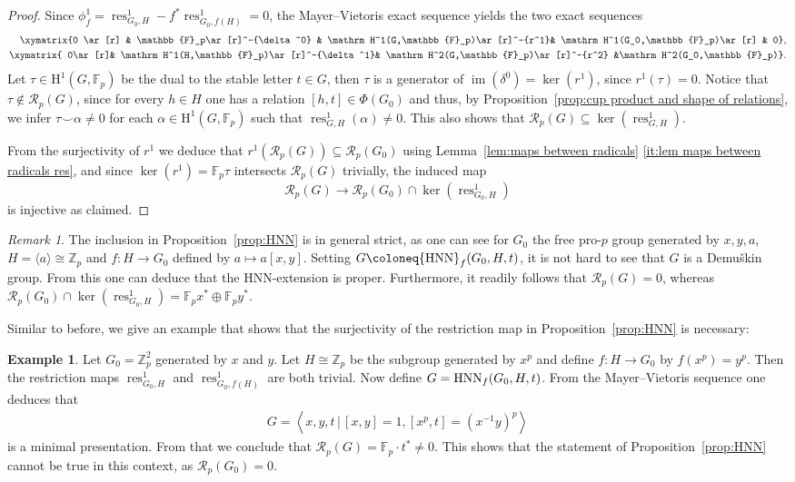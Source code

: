 \documentclass{amsart}
\theoremstyle{definition}
\newtheorem{ex}[thm]{Example}
\theoremstyle{remark}
\newtheorem{rem}[thm]{Remark}
\DeclareMathOperator{\im}{im}
\DeclareMathOperator{\res}{res}
\newcommand{\HNN}{{\rm HNN}}
\newcommand{\ZZ}{\mathbb{Z}}
\newcommand{\FF}{\mathbb{F}}
\newcommand{\calR}{\mathcal{R}}
\newcommand{\rmH}{\mathrm H}%
\newcommand{\pres}[2]{\left\langle{#1}\, \big\vert\, {#2}\right\rangle}
\newcommand{\F}{\FF}
\begin{document}
\begin{proof}
Since $\phi^1_f=\res^1_{G_0,H}-f^*\res^1_{G_0,f(H)}=0$, the Mayer--Vietoris exact sequence yields the two exact sequences 
	\begin{align*}
        \begin{split}
            \xymatrix{0 \ar[r] & \FF_p\ar[r]^-{\delta^0} & \rmH^1(G,\FF_p)\ar[r]^-{r^1}& \rmH^1(G_0,\F_p)\ar[r] & 0},\\
            \xymatrix{ 0\ar[r]& \rmH^1(H,\FF_p)\ar[r]^-{\delta ^1}& \rmH^2(G,\F_p)\ar[r]^-{r^2} &\rmH^2(G_0,\F_p)}.
        \end{split}
	\end{align*}
    Let $\tau\in \rmH^1(G,\FF_p)$ be the dual to the stable letter $t\in G$, then $\tau$ is a generator of $\im(\delta^0)=\ker(r^1)$, since $r^1(\tau)=0$. Notice that $\tau\not\in \calR_p(G)$, since for every $h\in H$ one has a relation $[h,t]\in \Phi(G_0)$ and thus, by Proposition~\ref{prop:cup product and shape of relations}, we infer $\tau\smallsmile \alpha\neq 0$ for each $\alpha\in \rmH^1(G,\FF_p)$ such that $\res_{G,H}^1(\alpha)\neq 0$. This also shows that $\calR_p(G)\subseteq \ker(\res_{G,H}^1)$.

    From the surjectivity of $r^1$ we deduce that $r^1(\calR_p(G))\subseteq \calR_p(G_0)$ using Lemma~\ref{lem:maps between radicals} \ref{it:lem maps between radicals res}, and since $\ker(r^1)=\FF_p\tau$ intersects $\calR_p(G)$ trivially, the induced map $$\calR_p(G)\longrightarrow \calR_p(G_0)\cap \ker(\res_{G_0,H}^1)$$ is injective as claimed.
\end{proof}
\begin{rem}
    The inclusion in Proposition~\ref{prop:HNN} is in general strict, as one can see for $G_0$ the free pro-$p$ group generated by $x,y,a$, $H=\langle a\rangle\cong \ZZ_p $ and $f:H\to G_0$ defined by $a\mapsto a[x,y]$. Setting $G\coloneq \HNN_f(G_0,H,t)$, it is not hard to see that $G$ is a Demu\v{s}kin group. From this one can deduce that the HNN-extension is proper. Furthermore, it readily follows that $\calR_p(G)=0$, whereas  $\calR_p(G_0)\cap \ker(\res_{G_0,H}^1)=\FF_px^*\oplus \FF_py^*$.
\end{rem}
Similar to before, we give an example that shows that the surjectivity of the restriction map in Proposition~\ref{prop:HNN} is necessary:
\begin{ex}
    Let $G_0=\ZZ_p^2$ generated by $x$ and $y$. Let $H\cong \ZZ_p$ be the subgroup generated by $x^p$ and define $f:H\to G_0$ by $f(x^p)=y^p$. Then the restriction maps $\res^1_{G_0,H}$ and $\res^1_{G_0,f(H)}$ are both trivial. Now define $G=\HNN_f(G_0,H,t)$. From the Mayer--Vietoris sequence one deduces that 
    \begin{align*}
        G=\pres{x,y,t}{[x,y]=1,[x^p,t]=(x^{-1}y)^p}
    \end{align*}
    is a minimal presentation. From that we conclude that $\calR_p(G)=\FF_p
    \cdot t^*\neq 0$. This shows that the statement of Proposition~\ref{prop:HNN} cannot be true in this context, as $\calR_p(G_0)=0$.
\end{ex}
\end{document}
